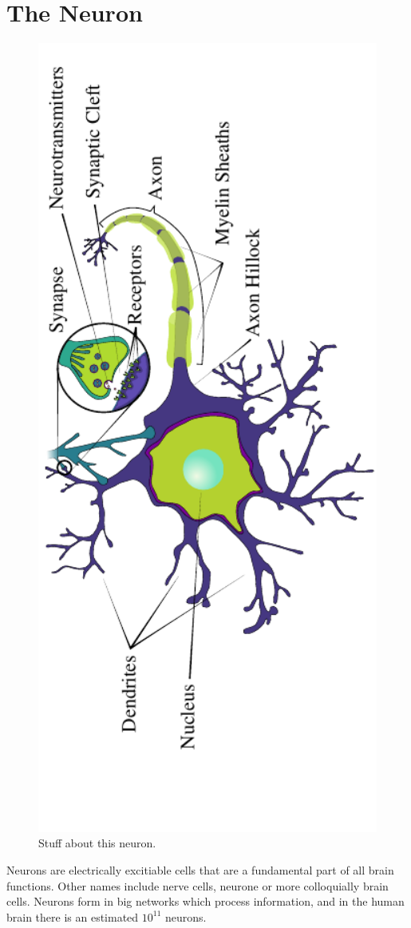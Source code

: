 \documentclass[altfont, fleqn]{uiophd}
\begin{document}
\section{The Neuron}
\begin{figure}[h]
    \centering
    \includegraphics[angle=-90,width=1.0\textwidth]{images/2_1/neuron_structure.pdf}
    \caption{Stuff about this neuron.}
    \label{fig:2_1_neuron}
\end{figure}
\noindent
{Neurons} 
are electrically excitiable cells
that are a fundamental part of all brain functions.
Other names include {nerve cells}, {neurone} or more 
colloquially {brain cells}.
Neurons form in big networks 
which process information,
and in the human brain there is an estimated $10^{11}$ neurons.
\end{document}
